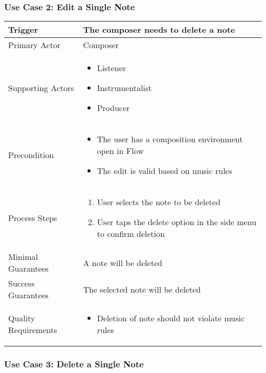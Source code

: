 \subsubsection{Use Case 2: Edit a Single Note}

\begin{tabularx}{\textwidth}{|X|X|}
\hline
Trigger & 
The composer needs to delete a note \\
\hline
Primary Actor & 
Composer\\
\hline
Supporting Actors & 
\begin{itemize}
\item Listener
\item Instrumentalist
\item Producer
\end{itemize} \\
\hline
Precondition & 
\begin{itemize}
\item The user has  a composition environment open in Flow  
\item The edit is valid based on music rules
\end{itemize} \\
\hline
Process Steps & 
\begin{enumerate}
\item User selects the note to be deleted 
\item User taps the delete option in the side menu to confirm deletion
\end{enumerate} \\
\hline
Minimal Guarantees & 
A note will be deleted \\
\hline
Success Guarantees & 
The selected note will be deleted \\
\hline
Quality Requirements & 
\begin{itemize}
\item Deletion of note should not violate music rules
\end{itemize} \\ 
\hline
\end{tabularx}


\subsubsection{Use Case 3: Delete a Single Note}

